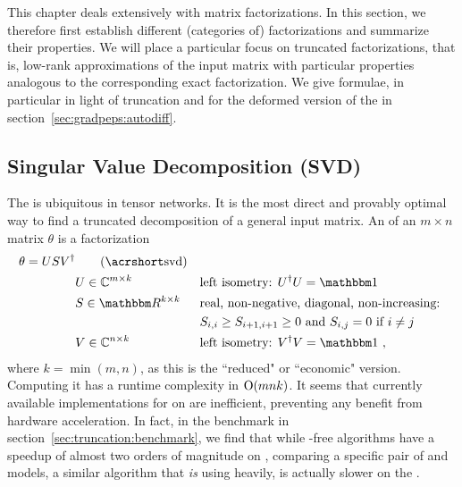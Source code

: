 This chapter deals extensively with matrix factorizations.
%
In this section, we therefore first establish different (categories of) factorizations and summarize their properties.
%
We will place a particular focus on truncated factorizations, that is, low-rank approximations of the input matrix with particular properties analogous to the corresponding exact factorization.
%
We give  formulae, in particular in light of truncation and for the deformed version of the  in section~\ref{sec:gradpeps:autodiff}.

\subsection{Singular Value Decomposition (SVD)}
\label{subsec:truncation:factorizations:svd}

The  is ubiquitous in tensor networks.
%
It is the most direct and provably optimal way to find a truncated decomposition of a general input matrix.
%
An  of an $m \times n$ matrix $\theta$ is a factorization
%
\begin{equation}
    \begin{aligned}
        \theta = U S \hconj{V} &\qquad \text{(\acroshort{svd})} &&
        \\
        &U \in \Cbb^{m \times k} &&\text{left isometry: } \hconj{U} U = \eye
        \\
        &S \in \Rbb^{k \times k} &&\text{real, non-negative, diagonal, non-increasing: }
        \\
        & &&S_{i,i} \geq S_{i+1, i+1} \geq 0 \text{ and } S_{i,j} = 0 \text{ if } i \neq j
        \\
        &V \in \Cbb^{n \times k} &&\text{left isometry: } \hconj{V} V = \eye
        ~,
    \end{aligned}
\end{equation}
where $k = \min(m, n)$, as this is the ``reduced" or ``economic" version.
%
Computing it has a runtime complexity in $\mathrm{O}(mnk)$.
%
It seems that currently available implementations for  on  are inefficient, preventing any benefit from hardware acceleration.
%
In fact, in the benchmark in section~\ref{sec:truncation:benchmark}, we find that while -free algorithms have a speedup of almost two orders of magnitude on , comparing a specific pair of  and  models, a similar algorithm that \emph{is} using  heavily, is actually slower on the .

